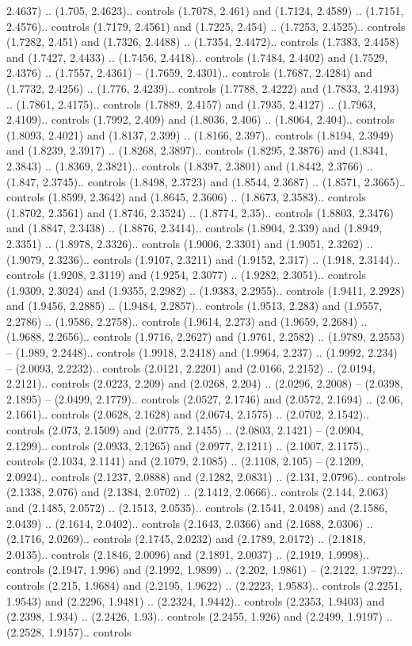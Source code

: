 2.4637) .. (1.705, 2.4623).. controls (1.7078, 2.461) and (1.7124, 2.4589) .. (1.7151, 2.4576).. controls (1.7179, 2.4561) and (1.7225, 2.454) .. (1.7253, 2.4525).. controls (1.7282, 2.451) and (1.7326, 2.4488) .. (1.7354, 2.4472).. controls (1.7383, 2.4458) and (1.7427, 2.4433) .. (1.7456, 2.4418).. controls (1.7484, 2.4402) and (1.7529, 2.4376) .. (1.7557, 2.4361) -- (1.7659, 2.4301).. controls (1.7687, 2.4284) and (1.7732, 2.4256) .. (1.776, 2.4239).. controls (1.7788, 2.4222) and (1.7833, 2.4193) .. (1.7861, 2.4175).. controls (1.7889, 2.4157) and (1.7935, 2.4127) .. (1.7963, 2.4109).. controls (1.7992, 2.409) and (1.8036, 2.406) .. (1.8064, 2.404).. controls (1.8093, 2.4021) and (1.8137, 2.399) .. (1.8166, 2.397).. controls (1.8194, 2.3949) and (1.8239, 2.3917) .. (1.8268, 2.3897).. controls (1.8295, 2.3876) and (1.8341, 2.3843) .. (1.8369, 2.3821).. controls (1.8397, 2.3801) and (1.8442, 2.3766) .. (1.847, 2.3745).. controls (1.8498, 2.3723) and (1.8544, 2.3687) .. (1.8571, 2.3665).. controls (1.8599, 2.3642) and (1.8645, 2.3606) .. (1.8673, 2.3583).. controls (1.8702, 2.3561) and (1.8746, 2.3524) .. (1.8774, 2.35).. controls (1.8803, 2.3476) and (1.8847, 2.3438) .. (1.8876, 2.3414).. controls (1.8904, 2.339) and (1.8949, 2.3351) .. (1.8978, 2.3326).. controls (1.9006, 2.3301) and (1.9051, 2.3262) .. (1.9079, 2.3236).. controls (1.9107, 2.3211) and (1.9152, 2.317) .. (1.918, 2.3144).. controls (1.9208, 2.3119) and (1.9254, 2.3077) .. (1.9282, 2.3051).. controls (1.9309, 2.3024) and (1.9355, 2.2982) .. (1.9383, 2.2955).. controls (1.9411, 2.2928) and (1.9456, 2.2885) .. (1.9484, 2.2857).. controls (1.9513, 2.283) and (1.9557, 2.2786) .. (1.9586, 2.2758).. controls (1.9614, 2.273) and (1.9659, 2.2684) .. (1.9688, 2.2656).. controls (1.9716, 2.2627) and (1.9761, 2.2582) .. (1.9789, 2.2553) -- (1.989, 2.2448).. controls (1.9918, 2.2418) and (1.9964, 2.237) .. (1.9992, 2.234) -- (2.0093, 2.2232).. controls (2.0121, 2.2201) and (2.0166, 2.2152) .. (2.0194, 2.2121).. controls (2.0223, 2.209) and (2.0268, 2.204) .. (2.0296, 2.2008) -- (2.0398, 2.1895) -- (2.0499, 2.1779).. controls (2.0527, 2.1746) and (2.0572, 2.1694) .. (2.06, 2.1661).. controls (2.0628, 2.1628) and (2.0674, 2.1575) .. (2.0702, 2.1542).. controls (2.073, 2.1509) and (2.0775, 2.1455) .. (2.0803, 2.1421) -- (2.0904, 2.1299).. controls (2.0933, 2.1265) and (2.0977, 2.1211) .. (2.1007, 2.1175).. controls (2.1034, 2.1141) and (2.1079, 2.1085) .. (2.1108, 2.105) -- (2.1209, 2.0924).. controls (2.1237, 2.0888) and (2.1282, 2.0831) .. (2.131, 2.0796).. controls (2.1338, 2.076) and (2.1384, 2.0702) .. (2.1412, 2.0666).. controls (2.144, 2.063) and (2.1485, 2.0572) .. (2.1513, 2.0535).. controls (2.1541, 2.0498) and (2.1586, 2.0439) .. (2.1614, 2.0402).. controls (2.1643, 2.0366) and (2.1688, 2.0306) .. (2.1716, 2.0269).. controls (2.1745, 2.0232) and (2.1789, 2.0172) .. (2.1818, 2.0135).. controls (2.1846, 2.0096) and (2.1891, 2.0037) .. (2.1919, 1.9998).. controls (2.1947, 1.996) and (2.1992, 1.9899) .. (2.202, 1.9861) -- (2.2122, 1.9722).. controls (2.215, 1.9684) and (2.2195, 1.9622) .. (2.2223, 1.9583).. controls (2.2251, 1.9543) and (2.2296, 1.9481) .. (2.2324, 1.9442).. controls (2.2353, 1.9403) and (2.2398, 1.934) .. (2.2426, 1.93).. controls (2.2455, 1.926) and (2.2499, 1.9197) .. (2.2528, 1.9157).. controls 